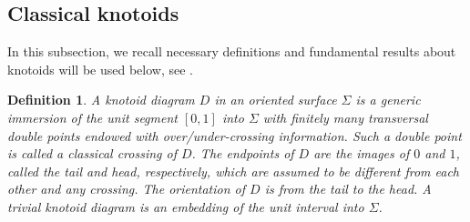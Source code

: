 \documentclass[11pt]{amsart}
\theoremstyle{noparens}
\newtheorem{definition}{Definition}[section]
\numberwithin{equation}{section}
\numberwithin{equation}{section}
\begin{document}
\subsection{Classical knotoids}
In this subsection, we recall necessary definitions and fundamental results about knotoids will be used below, see \cite{GK}. 

\begin{definition}{\rm 
A \textit{knotoid diagram} $D$ in an oriented surface $\Sigma$ is a generic immersion of the unit segment $[0,1]$ into $\Sigma$ with finitely many transversal double points endowed with over/under-crossing information. Such a double point is called a \textit{classical crossing} of $D$. The \textit{endpoints} of $D$ are the images of $0$ and $1$, called the \textit{tail} and \textit{head}, respectively, which are assumed to be different from each other and any crossing. The \textit{orientation} of $D$ is from the tail to the head. A \textit{trivial knotoid diagram} is an embedding of the unit interval into $\Sigma$. 
} 
\end{definition}
\end{document}
